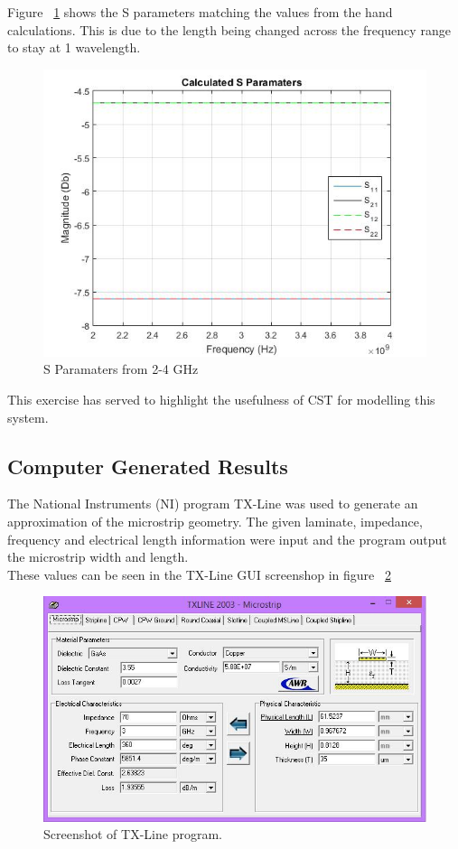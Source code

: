 \documentclass{paper}
\begin{document}
Figure ~\ref{fig:varying_l} shows the S parameters matching the values from the hand calculations. This is due to the length being changed across the frequency range to stay at 1 wavelength.

\begin{figure}[H]
	\centering
	\includegraphics[scale=0.5]{IMG/varying_l}
	\caption{S Paramaters from 2-4 GHz}
	\label{fig:varying_l}
\end{figure}

This exercise has served to highlight the usefulness of CST for modelling this system.





\subsection{Computer Generated Results}
\label{sec:tx-line}
The National Instruments (NI) program TX-Line was used to generate an approximation of the microstrip geometry. The given laminate, impedance, frequency and electrical length information were input and the program output the microstrip width and length. \\

These values can be seen in the TX-Line GUI screenshop in figure ~\ref{fig:txline}  

\begin{figure}[H]
	\centering
	\includegraphics[scale=0.6]{IMG/txline}
	\caption{Screenshot of TX-Line program.}
	\label{fig:txline}
\end{figure}
\end{document}

